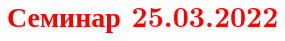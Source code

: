 \documentclass[main.tex]{subfiles}
\begin{document}
\section{\textcolor{red}{Семинар 25.03.2022}}
\end{document}
